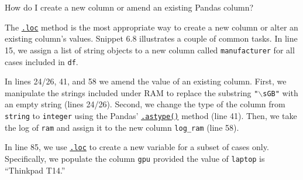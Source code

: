 \documentclass[a4paper,11pt]{book}
\newcommand{\question}[1]{%
    \begin{tcolorbox}[colback=comp_c!10,colframe=comp_c,sidebyside align=top,width=\linewidth,before skip=1ex]
        #1
    \end{tcolorbox}
    \switchcolumn%
}
\newcommand{\note}[1]{%
    \begin{tcolorbox}[colback=white!0,colframe=white!10,width=\linewidth,before skip=1ex]
        #1
    \end{tcolorbox}
}
\begin{document}
\begin{paracol}{2}
	\question{\raggedright How do I create a new column or amend an existing Pandas column?}
	\note{The \href{https://pandas.pydata.org/docs/reference/api/pandas.DataFrame.loc.html?highlight=loc#pandas.DataFrame.loc}{\texttt{.loc}} method is the most appropriate way to create a new column or alter an existing column's values. Snippet 6.8 illustrates a couple of common tasks. In line 15, we assign a list of string objects to a new column called \texttt{manufacturer} for all cases included in \texttt{df}. 
	
	\quad In lines 24/26, 41, and 58 we amend the value of an existing column. First, we manipulate the strings included under RAM to replace the substring \texttt{"$\backslash$sGB"} with an empty string (lines 24/26). Second, we change the type of the column from \texttt{string} to \texttt{integer} using the Pandas' \href{https://pandas.pydata.org/docs/reference/api/pandas.DataFrame.astype.html?highlight=astype#pandas.DataFrame.astype}{\texttt{.astype()}} method (line 41). Then, we take the log of \texttt{ram} and assign it to the new column \texttt{log\_ram} (line 58). 
	
	\quad In line 85, we use \href{https://pandas.pydata.org/docs/reference/api/pandas.DataFrame.loc.html?highlight=loc#pandas.DataFrame.loc}{\texttt{.loc}} to create a new variable for a subset of cases only. Specifically, we populate the column \texttt{gpu} provided the value of \texttt{laptop} is ``Thinkpad T14.''
	}
\end{paracol}
\end{document}
